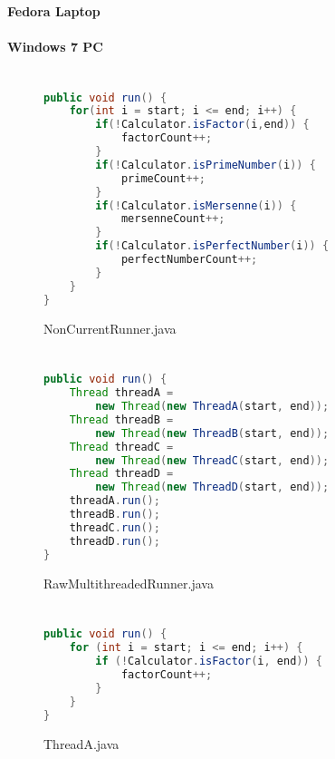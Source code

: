 \documentclass[]{report}
\begin{document}
\subsubsection{Fedora Laptop}
\subsubsection{Windows 7 PC}


\appendix
\chapter{}
\begin{figure}[h!]
	\caption{NonCurrentRunner.java}
	\begin{lstlisting}[language=Java,frame=single]
public void run() {
	for(int i = start; i <= end; i++) {
		if(!Calculator.isFactor(i,end)) {
			factorCount++;
		}
		if(!Calculator.isPrimeNumber(i)) {
			primeCount++;
		}
		if(!Calculator.isMersenne(i)) {
			mersenneCount++;
		}
		if(!Calculator.isPerfectNumber(i)) {
			perfectNumberCount++;
		}
	}
}
	\end{lstlisting}
\end{figure}

\chapter{}
\begin{figure}[h!]
	\caption{RawMultithreadedRunner.java}
	\begin{lstlisting}[language=Java,frame=single]
public void run() {
	Thread threadA = 
		new Thread(new ThreadA(start, end));
	Thread threadB = 
		new Thread(new ThreadB(start, end));
	Thread threadC = 
		new Thread(new ThreadC(start, end));
	Thread threadD = 
		new Thread(new ThreadD(start, end));
	threadA.run();
	threadB.run();
	threadC.run();
	threadD.run();
}
	\end{lstlisting}
\end{figure}

\chapter{}
\begin{figure}[h!]
	\caption{ThreadA.java}
	\begin{lstlisting}[language=Java,frame=single]
public void run() {
	for (int i = start; i <= end; i++) {
		if (!Calculator.isFactor(i, end)) {
			factorCount++;
		}
	}
}
	\end{lstlisting}
\end{figure}
\end{document}
